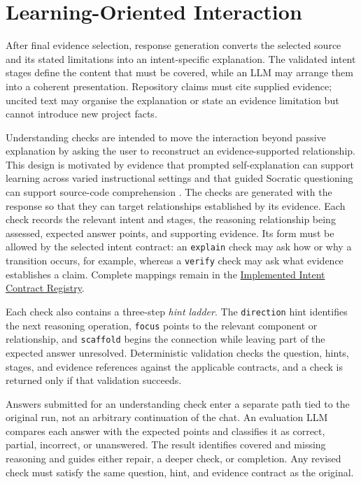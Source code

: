 \section{Learning-Oriented Interaction}\label{sec:learning-oriented-interaction}

After final evidence selection, response generation converts the selected source and its stated limitations into an intent-specific explanation. The validated intent stages define the content that must be covered, while an LLM may arrange them into a coherent presentation. Repository claims must cite supplied evidence; uncited text may organise the explanation or state an evidence limitation but cannot introduce new project facts.

Understanding checks are intended to move the interaction beyond passive explanation by asking the user to reconstruct an evidence-supported relationship. This design is motivated by evidence that prompted self-explanation can support learning across varied instructional settings \textcite{Bisra2018SelfExplanation} and that guided Socratic questioning can support source-code comprehension \textcite{Tamang2021Socratic}. The checks are generated with the response so that they can target relationships established by its evidence. Each check records the relevant intent and stages, the reasoning relationship being assessed, expected answer points, and supporting evidence. Its form must be allowed by the selected intent contract: an \texttt{explain} check may ask how or why a transition occurs, for example, whereas a \texttt{verify} check may ask what evidence establishes a claim. Complete mappings remain in the \hyperref[ch:implemented-intent-contract-registry]{Implemented Intent Contract Registry}.

Each check also contains a three-step \emph{hint ladder}. The \texttt{direction} hint identifies the next reasoning operation, \texttt{focus} points to the relevant component or relationship, and \texttt{scaffold} begins the connection while leaving part of the expected answer unresolved. Deterministic validation checks the question, hints, stages, and evidence references against the applicable contracts, and a check is returned only if that validation succeeds.

Answers submitted for an understanding check enter a separate path tied to the original run, not an arbitrary continuation of the chat. An evaluation LLM compares each answer with the expected points and classifies it as correct, partial, incorrect, or unanswered. The result identifies covered and missing reasoning and guides either repair, a deeper check, or completion. Any revised check must satisfy the same question, hint, and evidence contract as the original.

